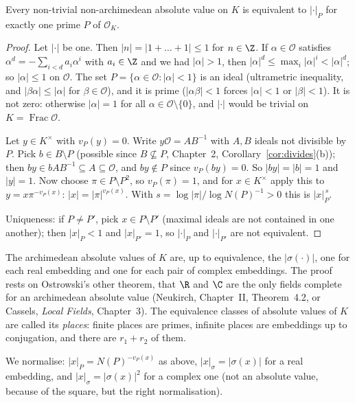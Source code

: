 \begin{theorem}\label{thm:ostrowskiK}
Every non-trivial non-archimedean absolute value on $K$ is equivalent to $|\cdot|_P$ for exactly one prime $P$ of
$\mathcal O_K$.
\end{theorem}
\begin{proof}
Let $|\cdot|$ be one. Then $|n|=|1+\dots+1|\le1$ for $n\in\Z$. If $\alpha\in\mathcal O$ satisfies $\alpha^d=-\sum_{i<d}a_i
\alpha^i$ with $a_i\in\Z$ and we had $|\alpha|>1$, then $|\alpha|^d\le\max_i|\alpha|^i<|\alpha|^d$; so $|\alpha|\le1$ on $\mathcal
O$. The set $P=\{\alpha\in\mathcal O:|\alpha|<1\}$ is an ideal (ultrametric inequality, and $|\beta\alpha|\le|\alpha|$ for
$\beta\in\mathcal O$), and it is prime ($|\alpha\beta|<1$ forces $|\alpha|<1$ or $|\beta|<1$). It is not zero: otherwise
$|\alpha|=1$ for all $\alpha\in\mathcal O\setminus\{0\}$, and $|\cdot|$ would be trivial on $K=\operatorname{Frac}\mathcal O$.

Let $y\in K^\times$ with $v_P(y)=0$. Write $y\mathcal O=AB^{-1}$ with $A,B$ ideals not divisible by $P$. Pick $b\in B\setminus P$
(possible since $B\not\subseteq P$, Chapter~2, Corollary~\ref{cor:divides}(b)); then $by\in bAB^{-1}\subseteq A\subseteq\mathcal O$,
and $by\notin P$ since $v_P(by)=0$. So $|by|=|b|=1$ and $|y|=1$. Now choose $\pi\in P\setminus P^2$, so $v_P(\pi)=1$, and for
$x\in K^\times$ apply this to $y=x\pi^{-v_P(x)}$: $|x|=|\pi|^{v_P(x)}$. With $s=\log|\pi|/\log N(P)^{-1}>0$ this is $|x|_P^{\,s}$.

Uniqueness: if $P\ne P'$, pick $x\in P\setminus P'$ (maximal ideals are not contained in one another); then $|x|_P<1$ and
$|x|_{P'}=1$, so $|\cdot|_P$ and $|\cdot|_{P'}$ are not equivalent.
\end{proof}

\begin{remark}
The archimedean absolute values of $K$ are, up to equivalence, the $|\sigma(\cdot)|$, one for each real embedding and one
for each pair of complex embeddings. The proof rests on Ostrowski's other theorem, that $\R$ and $\C$ are the only fields
complete for an archimedean absolute value (Neukirch, Chapter~II, Theorem~4.2, or Cassels, \emph{Local Fields}, Chapter~3).
The equivalence classes of absolute values of $K$ are called its \emph{places}: finite places are primes, infinite places
are embeddings up to conjugation, and there are $r_1+r_2$ of them.
\end{remark}

We normalise: $|x|_P=N(P)^{-v_P(x)}$ as above, $|x|_\sigma=|\sigma(x)|$ for a real embedding, and $|x|_\sigma=|\sigma(x)|^2$
for a complex one (not an absolute value, because of the square, but the right normalisation).

